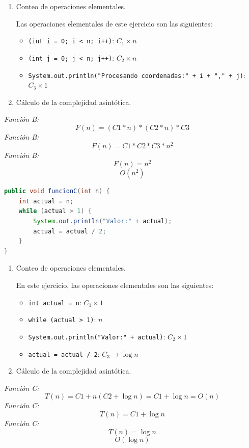 \documentclass[pdflatex,sn-mathphys-num]{sn-jnl}%
\theoremstyle{thmstyleone}%
\theoremstyle{thmstyletwo}%
\theoremstyle{thmstylethree}%
\begin{document}
\begin{enumerate}
    \item Conteo de operaciones elementales. 

Las operaciones elementales de este ejercicio son las siguientes:
\begin{itemize}
    \item \texttt{(int i = 0; i < n; i++)}: $C_1 \times n$
    \item \texttt{(int j = 0; j < n; j++)}: $C_2 \times n$
    \item \texttt{System.out.println("Procesando coordenadas:" + i + "," + j)}: $C_3 \times 1$
\end{itemize}

    \item C\'alculo de la complejidad asint\'otica.
\end{enumerate}

\textit{Funci\'on B:}
\[
F(n) = (C1 * n) * (C2 * n) * C3 
\]
\textit{Funci\'on B:}
\[
F(n) = C1 * C2 * C3 * n^2
\]
\textit{Funci\'on B:}
\[
F(n) = n^2
\]
\[
O(n^2)
\]

\begin{lstlisting}[language=Java,caption={C\'odigo C}]
public void funcionC(int n) {
    int actual = n;
    while (actual > 1) {
        System.out.println("Valor:" + actual);
        actual = actual / 2;
    }
}
\end{lstlisting}
\begin{enumerate}
    \item Conteo de operaciones elementales. 

En este ejercicio, las operaciones elementales son las siguientes:
\begin{itemize}
    \item \texttt{int actual = n}: $C_1 \times 1$
    \item \texttt{while (actual > 1)}: $n$
    \item \texttt{System.out.println("Valor:" + actual)}: $C_2 \times 1$
    \item \texttt{actual = actual / 2}: $C_3 \rightarrow \log n$
\end{itemize}

    \item C\'alculo de la complejidad asint\'otica.
\end{enumerate}

\textit{Funci\'on C:}
\[
T(n) = C1 + n(C2 + \log n) = C1 + \log n = O(n)
\]
\textit{Funci\'on C:}
\[
T(n) = C1 + \log n
\]
\textit{Funci\'on C:}
\[
T(n) = \log n
\]
\[
O(\log n)
\]
\end{document}
